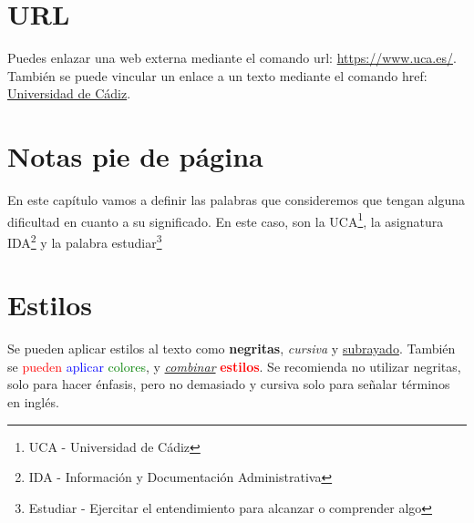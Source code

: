 \section{URL}

Puedes enlazar una web externa mediante el comando url: \url{https://www.uca.es/}. También se puede vincular un enlace a un texto mediante el comando href: \href{https://www.uca.es/}{Universidad de Cádiz}.
 
\section{Notas pie de página}
 En este capítulo vamos a definir las palabras que consideremos que tengan alguna dificultad en cuanto a su significado. En este caso, son la UCA\footnote{UCA - Universidad de Cádiz}, la asignatura IDA\footnote{IDA - Información y Documentación Administrativa} y la palabra estudiar\footnote{Estudiar - Ejercitar el entendimiento para alcanzar o comprender algo}

\section{Estilos}
Se pueden aplicar estilos al texto como \textbf{negritas}, \textit{cursiva} y \underline{subrayado}. También se \textcolor{red}{pueden} \textcolor{blue}{aplicar} \textcolor{green}{colores}, y \underline{\textit{combinar}} \textbf{\textcolor{red}{estilos}}. Se recomienda no utilizar negritas, solo para hacer énfasis, pero no demasiado y cursiva solo para señalar términos en inglés.
 
 
 
 
 
